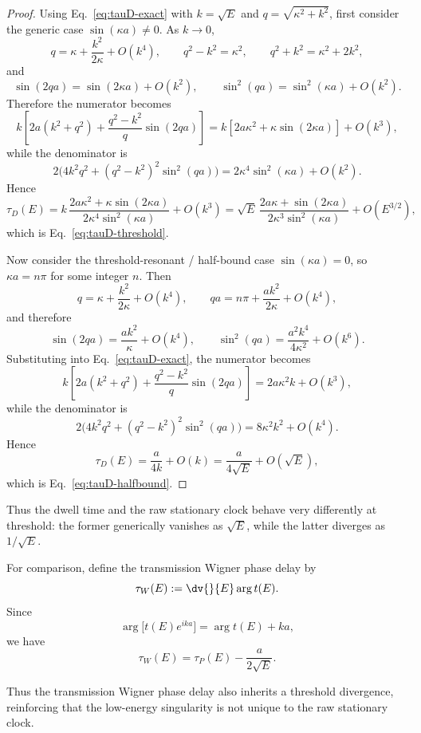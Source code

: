 \documentclass[aps,pra,preprint,notitlepage,nofootinbib]{revtex4-2}
\begin{document}
\begin{proof}
Using Eq.~\eqref{eq:tauD-exact} with $k=\sqrt{E}$ and $q=\sqrt{\kappa^2+k^2}$, first consider the generic case $\sin(\kappa a)\neq0$. As $k\to0$,
\[
q=\kappa+\frac{k^2}{2\kappa}+O(k^4),
\qquad
q^2-k^2=\kappa^2,
\qquad
q^2+k^2=\kappa^2+2k^2,
\]
and
\[
\sin(2qa)=\sin(2\kappa a)+O(k^2),
\qquad
\sin^2(qa)=\sin^2(\kappa a)+O(k^2).
\]
Therefore the numerator becomes
\[
k\left[2a(k^2+q^2)+\frac{q^2-k^2}{q}\sin(2qa)\right]
=
k\left[2a\kappa^2+\kappa\sin(2\kappa a)\right]
+O(k^3),
\]
while the denominator is
\[
2\Big(4k^2q^2+(q^2-k^2)^2\sin^2(qa)\Big)
=
2\kappa^4\sin^2(\kappa a)+O(k^2).
\]
Hence
\[
\tau_D(E)=
k\,\frac{2a\kappa^2+\kappa\sin(2\kappa a)}
{2\kappa^4\sin^2(\kappa a)}
+O(k^3)
=
\sqrt{E}\,
\frac{2a\kappa+\sin(2\kappa a)}
{2\kappa^3\sin^2(\kappa a)}
+O(E^{3/2}),
\]
which is Eq.~\eqref{eq:tauD-threshold}.

Now consider the threshold-resonant / half-bound case $\sin(\kappa a)=0$, so $\kappa a=n\pi$ for some integer $n$. Then
\[
q=\kappa+\frac{k^2}{2\kappa}+O(k^4),
\qquad
qa=n\pi+\frac{a k^2}{2\kappa}+O(k^4),
\]
and therefore
\[
\sin(2qa)=\frac{a k^2}{\kappa}+O(k^4),
\qquad
\sin^2(qa)=\frac{a^2 k^4}{4\kappa^2}+O(k^6).
\]
Substituting into Eq.~\eqref{eq:tauD-exact}, the numerator becomes
\[
k\left[2a(k^2+q^2)+\frac{q^2-k^2}{q}\sin(2qa)\right]
=
2a\kappa^2 k+O(k^3),
\]
while the denominator is
\[
2\Big(4k^2q^2+(q^2-k^2)^2\sin^2(qa)\Big)
=
8\kappa^2 k^2+O(k^4).
\]
Hence
\[
\tau_D(E)=\frac{a}{4k}+O(k)
=
\frac{a}{4\sqrt{E}}+O(\sqrt{E}),
\]
which is Eq.~\eqref{eq:tauD-halfbound}.
\end{proof}

Thus the dwell time and the raw stationary clock behave very differently at threshold: the former generically vanishes as $\sqrt{E}$, while the latter diverges as $1/\sqrt{E}$.

For comparison, define the transmission Wigner phase delay by~\cite{Wigner1955,Smith1960}
\begin{equation}
\tau_W(E):=\dv{}{E}\arg t(E).
\label{eq:tauW-def}
\end{equation}
Since
\begin{equation}
\arg\!\big[t(E)e^{ika}\big]=\arg t(E)+ka,
\end{equation}
we have
\begin{equation}
\tau_W(E)=\tau_P(E)-\frac{a}{2\sqrt{E}}.
\label{eq:tauW-tauP}
\end{equation}


Thus the transmission Wigner phase delay also inherits a threshold divergence, reinforcing that the low-energy singularity is not unique to the raw stationary clock.
\end{document}
